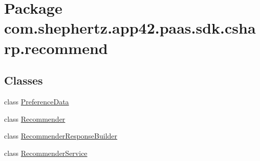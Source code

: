\hypertarget{namespacecom_1_1shephertz_1_1app42_1_1paas_1_1sdk_1_1csharp_1_1recommend}{\section{Package com.\+shephertz.\+app42.\+paas.\+sdk.\+csharp.\+recommend}
\label{namespacecom_1_1shephertz_1_1app42_1_1paas_1_1sdk_1_1csharp_1_1recommend}
}
\subsection*{Classes}
\begin{DoxyCompactItemize}
\item 
class \hyperlink{classcom_1_1shephertz_1_1app42_1_1paas_1_1sdk_1_1csharp_1_1recommend_1_1_preference_data}{Preference\+Data}
\item 
class \hyperlink{classcom_1_1shephertz_1_1app42_1_1paas_1_1sdk_1_1csharp_1_1recommend_1_1_recommender}{Recommender}
\item 
class \hyperlink{classcom_1_1shephertz_1_1app42_1_1paas_1_1sdk_1_1csharp_1_1recommend_1_1_recommender_response_builder}{Recommender\+Response\+Builder}
\item 
class \hyperlink{classcom_1_1shephertz_1_1app42_1_1paas_1_1sdk_1_1csharp_1_1recommend_1_1_recommender_service}{Recommender\+Service}

\end{DoxyCompactItemize}
